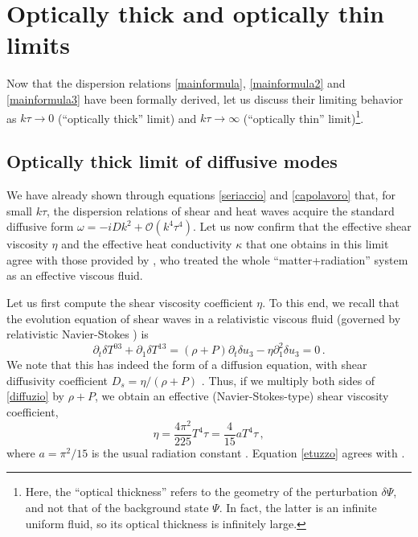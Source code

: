 \documentclass[a4paper, amsfonts, amssymb, amsmath, reprint, showkeys, nofootinbib, twoside,notitlepage,onecolumn]{revtex4-2}
\theoremstyle{definition}
\theoremstyle{theorem}
\theoremstyle{corollary}
\begin{document}
\section{Optically thick and optically thin limits}

Now that the dispersion relations \eqref{mainformula}, \eqref{mainformula2} and \eqref{mainformula3} have been formally derived, let us discuss their limiting behavior as $k\tau \rightarrow 0$ (``optically thick'' limit) and $k\tau \rightarrow \infty$ (``optically thin'' limit)\footnote{Here, the ``optical thickness'' refers to the geometry of the perturbation $\delta \Psi$, and not that of the background state $\Psi$. In fact, the latter is an infinite uniform fluid, so its optical thickness is infinitely large.}.

\subsection{Optically thick limit of diffusive modes}

We have already shown through equations \eqref{seriaccio} and \eqref{capolavoro} that, for small $k\tau$, the dispersion relations of shear and heat waves acquire the standard diffusive form $\omega = -iD k^2+\mathcal{O}(k^4\tau^4)$. Let us now confirm that the effective shear viscosity $\eta$ and the effective heat conductivity $\kappa$ that one obtains in this limit agree with those provided by \citet{Weinberg1971}, who treated the whole ``matter+radiation'' system as an effective viscous fluid. 

Let us first compute the shear viscosity coefficient $\eta$.
To this end, we recall that the evolution equation of shear waves in a relativistic viscous fluid (governed by relativistic Navier-Stokes \cite{Weinberg1971,Eckart40}) is
\begin{equation}
\partial_t \delta T^{03} +\partial_1 \delta T^{13}= (\rho{+}P)\partial_t \delta u_3 -\eta \partial_1^2 \delta u_3=0 \, .
\end{equation}
We note that this has indeed the form of a diffusion equation, with shear diffusivity coefficient $D_s{=}\eta/(\rho{+}P)$ \cite[\S IId]{Weinberg1971}. Thus, if we multiply both sides of \eqref{diffuzio} by $\rho{+}P$, we obtain an effective (Navier-Stokes-type) shear viscosity coefficient,
\begin{equation}\label{etuzzo}
\eta = \dfrac{4\pi^2}{225} T^4 \tau = \dfrac{4}{15} a T^4 \tau  \, ,
\end{equation}
where $a=\pi^2/15$ is the usual radiation constant \cite{rezzolla_book}. Equation \eqref{etuzzo} agrees with \cite{Weinberg1971,Misner1968,Rebetzky1990}.
\end{document}
